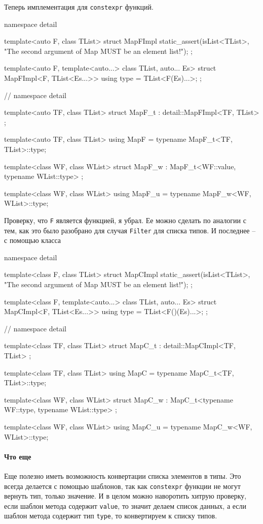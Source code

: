 Теперь имплементация для \verb"constexpr" функций.
\begin{cppcode}
namespace detail {
template<auto F, class TList>
struct MapFImpl {
  static_assert(isList<TList>,
                "The second argument of Map MUST be an element list!");
};

template<auto F, template<auto...> class TList, auto... Es>
struct MapFImpl<F, TList<Es...>> {
  using type = TList<F(Es)...>;
};
} // namespace detail

template<auto TF, class TList>
struct MapF_t : detail::MapFImpl<TF, TList> {};

template<auto TF, class TList>
using MapF = typename MapF_t<TF, TList>::type;

template<class WF, class WList>
struct MapF_w : MapF_t<WF::value, typename WList::type> {};

template<class WF, class WList>
using MapF_u = typename MapF_w<WF, WList>::type;
\end{cppcode}
Проверку, что \verb"F" является функцией, я убрал.
Ее можно сделать по аналогии с тем, как это было разобрано для случая \verb"Filter" для списка типов.
И последнее -- с помощью класса
\begin{cppcode}
namespace detail {
template<class F, class TList>
struct MapCImpl {
  static_assert(isList<TList>,
                "The second argument of Map MUST be an element list!");
};

template<class F, template<auto...> class TList, auto... Es>
struct MapCImpl<F, TList<Es...>> {
  using type = TList<F()(Es)...>;
};
} // namespace detail

template<class TF, class TList>
struct MapC_t : detail::MapCImpl<TF, TList> {};

template<class TF, class TList>
using MapC = typename MapC_t<TF, TList>::type;

template<class WF, class WList>
struct MapC_w : MapC_t<typename WF::type, typename WList::type> {};

template<class WF, class WList>
using MapC_u = typename MapC_w<WF, WList>::type;
\end{cppcode}

\paragraph{Что еще}

Еще полезно иметь возможность конвертации списка элементов в типы.
Это всегда делается с помощью шаблонов, так как \verb"constexpr" функции не могут вернуть тип, только значение.
И в целом можно наворотить хитрую проверку, если шаблон метода содержит \verb"value", то значит делаем список данных, а если шаблон метода содержит тип \verb"type", то конвертируем к списку типов.

